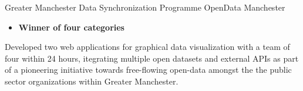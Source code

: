 \documentclass[12pt,a4paper]{article}
\begin{document}
       {Greater Manchester Data Synchronization Programme}
       {OpenData Manchester}
{%
  \begin{itemize}
    \item {\bfseries Winner of four categories}
  \end{itemize}

  Developed two web applications for graphical data visualization with a team of
  four within 24 hours, itegrating multiple open datasets and external APIs as
  part of a pioneering initiative towards free-flowing open-data amongst the
  the public sector organizations within Greater Manchester.
}
\end{document}

